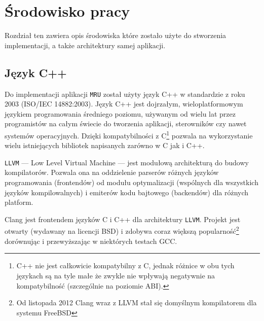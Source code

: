 \chapter{Środowisko pracy}
\par
Rozdział ten zawiera opis środowiska które zostało użyte do stworzenia implementacji, a także architektury samej aplikacji.

\section{Język C++}
\par
Do implementacji aplikacji \texttt{MRU} został użyty język C++ w standardzie z roku 2003 (ISO/IEC 14882:2003).
Język C++ jest dojrzałym, wieloplatformowym językiem programowania średniego poziomu, używanym od wielu lat przez programistów na całym świecie do tworzenia aplikacji, sterowników czy nawet systemów operacyjnych. Dzięki kompatybilności z C\footnote{C++ nie jest całkowicie kompatybilny z  C, jednak różnice w obu tych językach są na tyle małe że zwykle nie wpływają negatywnie na kompatybilność (szczególnie na poziomie ABI).} pozwala na wykorzystanie wielu istniejących bibliotek napisanych zarówno w C jak i C++.

\par
\texttt{LLVM} --- Low Level Virtual Machine --- jest modułową architekturą do budowy kompilatorów. Pozwala ona na oddzielenie parserów różnych języków programowania (frontendów) od modułu optymalizacji (wspólnych dla wszystkich języków kompilowalnych) i emiterów kodu bajtowego (backendów) dla różnych platform.

\par
Clang jest frontendem języków C i C++ dla architektury \texttt{LLVM}. Projekt jest otwarty (wydawany na licencji BSD) i zdobywa coraz większą popularność\footnote{Od listopada 2012 Clang wraz z LLVM stał się domyślnym kompilatorem dla systemu FreeBSD} dorównując i przewyższając w niektórych testach GCC.

